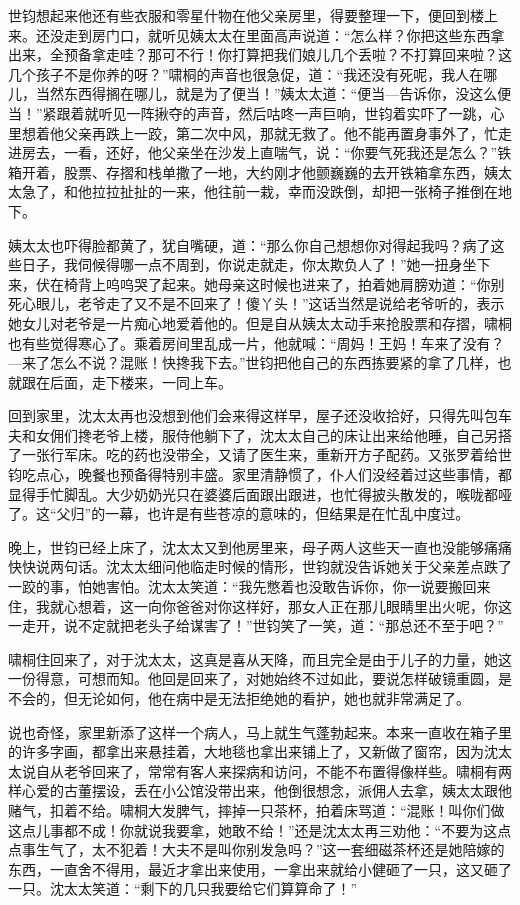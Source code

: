 \par 世钧想起来他还有些衣服和零星什物在他父亲房里，得要整理一下，便回到楼上来。还没走到房门口，就听见姨太太在里面高声说道：“怎么样？你把这些东西拿出来，全预备拿走哇？那可不行！你打算把我们娘儿几个丢啦？不打算回来啦？这几个孩子不是你养的呀？”啸桐的声音也很急促，道：“我还没有死呢，我人在哪儿，当然东西得搁在哪儿，就是为了便当！”姨太太道：“便当—告诉你，没这么便当！”紧跟着就听见一阵揪夺的声音，然后咕咚一声巨响，世钧着实吓了一跳，心里想着他父亲再跌上一跤，第二次中风，那就无救了。他不能再置身事外了，忙走进房去，一看，还好，他父亲坐在沙发上直喘气，说：“你要气死我还是怎么？”铁箱开着，股票、存摺和栈单撒了一地，大约刚才他颤巍巍的去开铁箱拿东西，姨太太急了，和他拉拉扯扯的一来，他往前一栽，幸而没跌倒，却把一张椅子推倒在地下。
\par 姨太太也吓得脸都黄了，犹自嘴硬，道：“那么你自己想想你对得起我吗？病了这些日子，我伺候得哪一点不周到，你说走就走，你太欺负人了！”她一扭身坐下来，伏在椅背上呜呜哭了起来。她母亲这时候也进来了，拍着她肩膀劝道：“你别死心眼儿，老爷走了又不是不回来了！傻丫头！”这话当然是说给老爷听的，表示她女儿对老爷是一片痴心地爱着他的。但是自从姨太太动手来抢股票和存摺，啸桐也有些觉得寒心了。乘着房间里乱成一片，他就喊：“周妈！王妈！车来了没有？—来了怎么不说？混账！快搀我下去。”世钧把他自己的东西拣要紧的拿了几样，也就跟在后面，走下楼来，一同上车。
\par 回到家里，沈太太再也没想到他们会来得这样早，屋子还没收拾好，只得先叫包车夫和女佣们搀老爷上楼，服侍他躺下了，沈太太自己的床让出来给他睡，自己另搭了一张行军床。吃的药也没带全，又请了医生来，重新开方子配药。又张罗着给世钧吃点心，晚餐也预备得特别丰盛。家里清静惯了，仆人们没经着过这些事情，都显得手忙脚乱。大少奶奶光只在婆婆后面跟出跟进，也忙得披头散发的，喉咙都哑了。这“父归”的一幕，也许是有些苍凉的意味的，但结果是在忙乱中度过。
\par 晚上，世钧已经上床了，沈太太又到他房里来，母子两人这些天一直也没能够痛痛快快说两句话。沈太太细问他临走时候的情形，世钧就没告诉她关于父亲差点跌了一跤的事，怕她害怕。沈太太笑道：“我先憋着也没敢告诉你，你一说要搬回来住，我就心想着，这一向你爸爸对你这样好，那女人正在那儿眼睛里出火呢，你这一走开，说不定就把老头子给谋害了！”世钧笑了一笑，道：“那总还不至于吧？”
\par 啸桐住回来了，对于沈太太，这真是喜从天降，而且完全是由于儿子的力量，她这一份得意，可想而知。他回是回来了，对她始终不过如此，要说怎样破镜重圆，是不会的，但无论如何，他在病中是无法拒绝她的看护，她也就非常满足了。
\par 说也奇怪，家里新添了这样一个病人，马上就生气蓬勃起来。本来一直收在箱子里的许多字画，都拿出来悬挂着，大地毯也拿出来铺上了，又新做了窗帘，因为沈太太说自从老爷回来了，常常有客人来探病和访问，不能不布置得像样些。啸桐有两样心爱的古董摆设，丢在小公馆没带出来，他倒很想念，派佣人去拿，姨太太跟他赌气，扣着不给。啸桐大发脾气，摔掉一只茶杯，拍着床骂道：“混账！叫你们做这点儿事都不成！你就说我要拿，她敢不给！”还是沈太太再三劝他：“不要为这点点事生气了，太不犯着！大夫不是叫你别发急吗？”这一套细磁茶杯还是她陪嫁的东西，一直舍不得用，最近才拿出来使用，一拿出来就给小健砸了一只，这又砸了一只。沈太太笑道：“剩下的几只我要给它们算算命了！”
